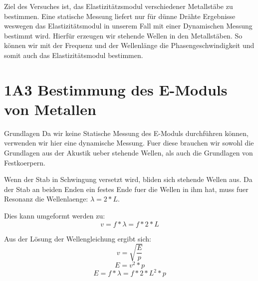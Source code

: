\documentclass[twoside]{protokoll}
\begin{document}
 
\begin{versuchsziele}
Ziel des Versuches ist, das Elastizitätzsmodul verschiedener Metallstäbe zu bestimmen.
Eine statische Messung liefert nur für dünne Drähte Ergebnisse weswegen das Elastizitätsmodul in unserem Fall mit einer Dynamischen Messung bestimmt wird. Hierfür erzeugen wir stehende Wellen in den Metallstäben. So können wir mit der Frequenz und der Wellenlänge die Phasengeschwindigkeit und somit auch das Elastizitätsmodul bestimmen. 
\end{versuchsziele}

 
\section{1A3 Bestimmung des E-Moduls von Metallen}

\begin{aufgabe}{Grundlagen}
    Da wir keine Statische Messung des E-Moduls durchführen können, verwenden wir hier eine dynamische Messung.
    Fuer diese brauchen wir sowohl die Grundlagen aus der Akustik ueber stehende Wellen, als auch die Grundlagen von Festkoerpern.

     
    Wenn der Stab in Schwingung versetzt wird, bliden sich stehende Wellen aus.
    Da der Stab an beiden Enden ein festes Ende fuer die Wellen in ihm hat, muss fuer Resonanz die Wellenlaenge: $\lambda = 2 * L$. 
     
    Dies kann umgeformt werden zu:
    \begin{equation}
        v = f * \lambda = f * 2 * L
    \end{equation}

    Aus der Lösung der Wellengleichung ergibt sich:
    \begin{equation}
         v = \sqrt{\frac{E}{p}}
    \end{equation}
    \begin{equation}
         E = v ^2 * p
    \end{equation}
    \begin{equation}
         E = f * \lambda = f * 2 * L ^2 * p
    \end{equation}

     
\end{aufgabe}
\end{document}
